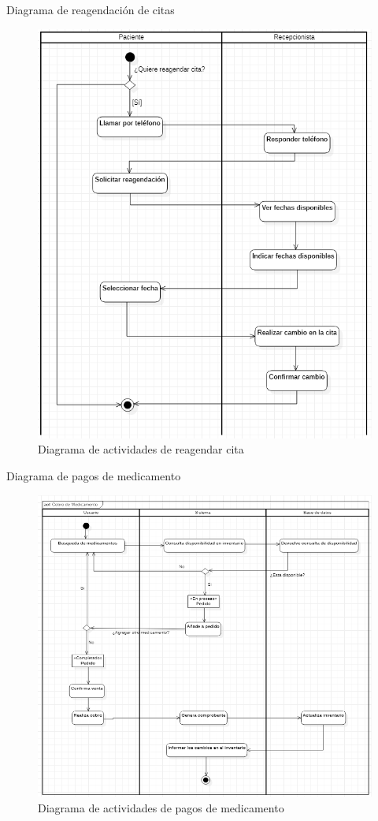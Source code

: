 \documentclass[12pt,letterpaper]{article}
\begin{document}
        \newpage
        Diagrama de reagendación de citas
        \begin{figure}[H]
            \centering
            \includegraphics [scale=0.7]{actividades/reagendarCita}
            \caption{Diagrama de actividades de reagendar cita}
        \end{figure}

        \newpage
        Diagrama de pagos de medicamento
        \begin{figure}[H]
            \centering
            \includegraphics [scale=0.7]{actividades/pagarMedicamento}
            \caption{Diagrama de actividades de pagos de medicamento}
        \end{figure}
\end{document}
